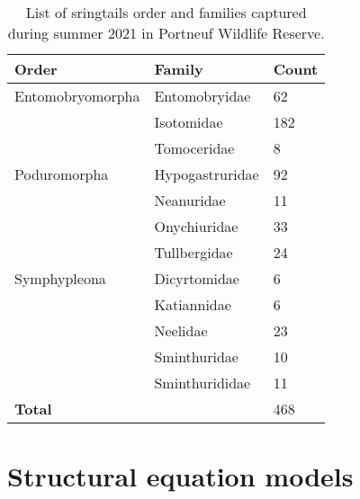   \begin{table}[ht]
    \centering
    \caption[List of sringtails order and families]
    {List of sringtails order and families captured during summer 2021 in Portneuf Wildlife Reserve.}
    \label{tab:springtail}
    \begin{tabular}{lll} 
        \hline
        Order & Family & Count \\ [0.5ex] 
        \hline      
        Entomobryomorpha    & Entomobryidae     & 62 \\  
                            & Isotomidae        & 182 \\
                            & Tomoceridae       & 8 \\
        Poduromorpha        & Hypogastruridae   & 92 \\
                            & Neanuridae        & 11 \\
                            & Onychiuridae      & 33 \\
                            & Tullbergidae      & 24 \\
        Symphypleona        & Dicyrtomidae      & 6 \\
                            & Katiannidae       & 6 \\
                            & Neelidae          & 23 \\
                            & Sminthuridae      & 10 \\
                            & Sminthurididae    & 11 \\
                            \hline 
        \textbf{Total}      &                   & 468 \\
        \hline
    \end{tabular}
  \end{table}

  \clearpage

  \section{Structural equation models}

